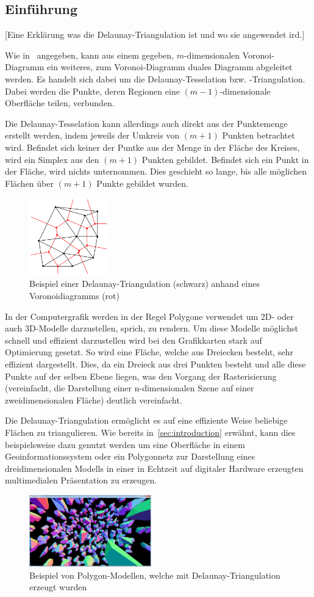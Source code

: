 \subsection{Einführung}
\label{subsec:delaunay-introduction}
[Eine Erklärung was die Delaunay-Triangulation ist und wo sie angewendet ird.]

Wie in~\cite{atsuyuki2000spatialtessellations} angegeben, kann aus einem gegeben, $m$-dimensionalen Voronoi-Diagramm ein weiteres, zum Voronoi-Diagramm duales Diagramm abgeleitet werden. Es handelt sich dabei um die Delaunay-Tesselation bzw. -Triangulation. Dabei werden die Punkte, deren Regionen eine $(m-1)$-dimensionale Oberfläche teilen, verbunden.

Die Delaunay-Tesselation kann allerdings auch direkt aus der Punktemenge erstellt werden, indem jeweils der Umkreis von $(m+1)$ Punkten betrachtet wird. Befindet sich keiner der Puntke aus der Menge in der Fläche des Kreises, wird ein Simplex aus den $(m+1)$ Punkten gebildet. Befindet sich ein Punkt in der Fläche, wird nichts unternommen. Dies geschieht so lange, bis alle möglichen Flächen über $(m+1)$ Punkte gebildet wurden.

\begin{figure}[h]
\centering
\includegraphics[width=130px]{images/voronoi_delaunay_example_01.png}
\caption{Beispiel einer Delaunay-Triangulation (schwarz) anhand eines Voronoidiagramms (rot)}
\label{fig:delaunayVoronoiExample}
\end{figure}


In der Computergrafik werden in der Regel Polygone verwendet um 2D- oder auch 3D-Modelle darzustellen, sprich, zu rendern. Um diese Modelle möglichst schnell und effizient darzustellen wird bei den Grafikkarten stark auf Optimierung gesetzt. So wird eine Fläche, welche aus Dreiecken besteht, sehr effizient dargestellt. Dies, da ein Dreieck aus drei Punkten besteht und alle diese Punkte auf der selben Ebene liegen, was den Vorgang der Rasterisierung (vereinfacht, die Darstellung einer n-dimensionalen Szene auf einer zweidimensionalen Fläche) deutlich vereinfacht.

Die Delaunay-Triangulation ermöglicht es auf eine effiziente Weise beliebige Flächen zu triangulieren. Wie bereits in~\ref{sec:introduction} erwähnt, kann dies beispielsweise dazu genutzt werden um eine Oberfläche in einem Geoinformationssystem oder ein Polygonnetz zur Darstellung eines dreidimensionalen Modells in einer in Echtzeit auf digitaler Hardware erzeugten multimedialen Präsentation zu erzeugen.

\begin{figure}[h]
\centering
\includegraphics[width=200px]{images/voronoi_delaunay_example_02.png}
\caption[width=100px]{Beispiel von Polygon-Modellen, welche mit Delaunay-Triangulation erzeugt wurden}
\label{fig:delaunayVoronoiExample2}
\end{figure}
